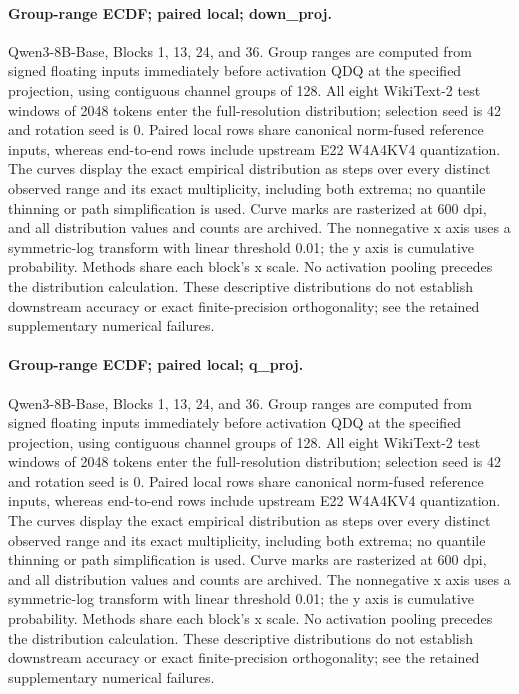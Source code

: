 \paragraph{Group-range ECDF; paired local; down\_proj.} Qwen3-8B-Base, Blocks 1, 13, 24, and 36. Group ranges are computed from signed floating inputs immediately before activation QDQ at the specified projection, using contiguous channel groups of 128. All eight WikiText-2 test windows of 2048 tokens enter the full-resolution distribution; selection seed is 42 and rotation seed is 0. Paired local rows share canonical norm-fused reference inputs, whereas end-to-end rows include upstream E22 W4A4KV4 quantization. The curves display the exact empirical distribution as steps over every distinct observed range and its exact multiplicity, including both extrema; no quantile thinning or path simplification is used. Curve marks are rasterized at 600 dpi, and all distribution values and counts are archived. The nonnegative x axis uses a symmetric-log transform with linear threshold 0.01; the y axis is cumulative probability. Methods share each block's x scale. No activation pooling precedes the distribution calculation. These descriptive distributions do not establish downstream accuracy or exact finite-precision orthogonality; see the retained supplementary numerical failures.

\paragraph{Group-range ECDF; paired local; q\_proj.} Qwen3-8B-Base, Blocks 1, 13, 24, and 36. Group ranges are computed from signed floating inputs immediately before activation QDQ at the specified projection, using contiguous channel groups of 128. All eight WikiText-2 test windows of 2048 tokens enter the full-resolution distribution; selection seed is 42 and rotation seed is 0. Paired local rows share canonical norm-fused reference inputs, whereas end-to-end rows include upstream E22 W4A4KV4 quantization. The curves display the exact empirical distribution as steps over every distinct observed range and its exact multiplicity, including both extrema; no quantile thinning or path simplification is used. Curve marks are rasterized at 600 dpi, and all distribution values and counts are archived. The nonnegative x axis uses a symmetric-log transform with linear threshold 0.01; the y axis is cumulative probability. Methods share each block's x scale. No activation pooling precedes the distribution calculation. These descriptive distributions do not establish downstream accuracy or exact finite-precision orthogonality; see the retained supplementary numerical failures.

